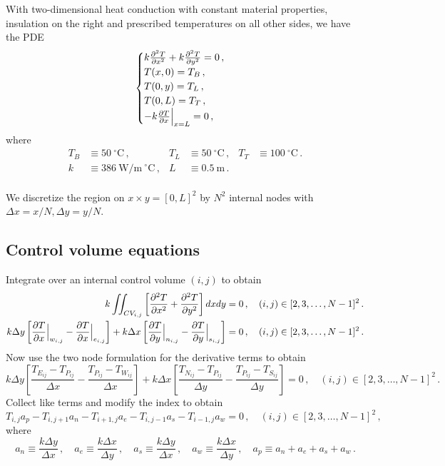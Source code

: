 \documentclass{article}
\begin{document}
With two-dimensional heat conduction with constant material properties, insulation on the right and prescribed temperatures on all other sides, we have the PDE
\begin{equation}
	\begin{cases}
		k \pdv{^2T}{x^2} + k \pdv{^2T}{y^2} = 0\,,\\
		T(x, 0) = T_B\,,\\
		T(0, y) = T_L\,,\\
		T(0, L) = T_T\,,\\
		-k \pdv{T}{x} \Big|_{x = L} = 0\,,
	\end{cases}
\end{equation}
where
\begin{align*}
	T_B & \equiv 50~^\circ\text{C}\,, & T_L & \equiv 50~^\circ\text{C}\,, & T_T & \equiv 100~^\circ\text{C}\,.\\
	k & \equiv 386~\text{W/m}~^\circ\text{C}\,, & L & \equiv 0.5~\text{m}\,.\\
\end{align*}

We discretize the region on $x \times y = [0, L]^2$ by $N^2$ internal nodes with $\Delta x = x / N, \Delta y = y / N$.

\subsection*{Control volume equations}

Integrate over an internal control volume $(i,j)$ to obtain
\begin{align*}
	k \iint_{CV_{i, j}} \left[ \pdv{^2T}{x^2} + \pdv{^2T}{y^2} \right] dxdy & = 0\,, \quad (i, j) \in [2, 3, \ldots, N - 1]^2\,.\\
	k \Delta y \left[ \pdv{T}{x}\Big|_{w_{i,j}} - \pdv{T}{x}\Big|_{e_{i,j}} \right] + k \Delta x \left[ \pdv{T}{y}\Big|_{n_{i,j}} - \pdv{T}{y}\Big|_{s_{i,j}} \right] & = 0\,, \quad (i, j) \in [2, 3, \ldots, N - 1]^2\,.
\end{align*}
Now use the two node formulation for the derivative terms to obtain
\[
	k \Delta y \left[\frac{T_{E_{ij}} - T_{P_{ij}}}{\Delta x} - \frac{T_{P_{ij}} - T_{W_{ij}}}{\Delta x}\right] + k \Delta x \left[ \frac{T_{N_{ij}} - T_{P_{ij}}}{\Delta y} -\frac{T_{P_{ij}} - T_{S_{ij}}}{\Delta y} \right] = 0\,, \quad (i, j) \in [2, 3, \ldots, N - 1]^2\,.
\]
Collect like terms and modify the index to obtain
\begin{equation}
	\label{eq:internal}
	T_{i,j} a_p - T_{i, j+1} a_n - T_{i+1, j} a_e - T_{i, j-1} a_s - T_{i-1, j} a_w = 0\,,\quad (i, j) \in [2, 3, \ldots, N - 1]^2\,,
\end{equation}
where
\[
	a_n \equiv \frac{k \Delta y}{\Delta x}\,, \quad a_e \equiv \frac{k \Delta x}{\Delta y}\,, \quad a_s \equiv \frac{k\Delta y}{\Delta x}\,, \quad a_w \equiv \frac{k\Delta x}{\Delta y}\,, \quad a_p \equiv a_n + a_e + a_s + a_w\,.
\]
\end{document}
